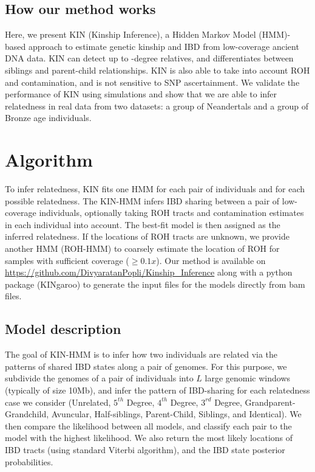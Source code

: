 \documentclass[12pt, letterpaper]{article}
\begin{document}
\subsection{How our method works}
Here, we present KIN (Kinship Inference), a Hidden Markov Model (HMM)-based approach to estimate genetic kinship and IBD from low-coverage ancient DNA data. KIN can detect up to -degree relatives, and differentiates between siblings and parent-child relationships. KIN is also able to take into account ROH and contamination, and is not sensitive to SNP ascertainment. We validate the performance of KIN using simulations and show that we are able to infer relatedness in real data from two datasets: a group of Neandertals and a group of Bronze age individuals.


\section{Algorithm}\label{new_approaches}
To infer relatedness, KIN fits one HMM for each pair of individuals and for each possible relatedness. The KIN-HMM infers IBD sharing between a pair of low-coverage individuals, optionally taking ROH tracts and contamination estimates in each individual into account. The best-fit model is then assigned as the inferred relatedness. If the locations of ROH tracts are unknown, we provide another HMM (ROH-HMM) to coarsely estimate the location of ROH for samples with sufficient coverage ($\geq 0.1x$). Our method is available on \url{https://github.com/DivyaratanPopli/Kinship_Inference} along with a python package (KINgaroo) to generate the input files for the models directly from bam files.


\subsection{Model description}\label{method_overview}
The goal of KIN-HMM is to infer how two individuals are related via the patterns of shared IBD states along a pair of genomes. For this purpose,  we subdivide the genomes of a pair of individuals into $L$ large genomic windows (typically of size 10Mb), and infer the pattern of IBD-sharing for each relatedness case we consider (Unrelated, $5^{th}$ Degree, $4^{th}$ Degree, $3^{rd}$ Degree, Grandparent-Grandchild, Avuncular, Half-siblings, Parent-Child, Siblings, and Identical). We then compare the likelihood between all models, and classify each pair to the model with the highest likelihood. We also return the most likely locations of IBD tracts (using standard Viterbi algorithm), and the IBD state posterior probabilities.
\end{document}
